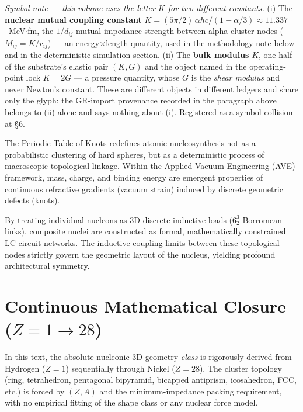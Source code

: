 \noindent\emph{Symbol note --- this volume uses the letter $K$ for two different constants.} (i) The \textbf{nuclear mutual coupling constant} $K = (5\pi/2)\,\alpha\hbar c/(1-\alpha/3) \approx 11.337$~MeV$\cdot$fm, the $1/d_{ij}$ mutual-impedance strength between alpha-cluster nodes ($M_{ij} = K/r_{ij}$) --- an energy$\times$length quantity, used in the methodology note below and in the deterministic-simulation section. (ii) The \textbf{bulk modulus} $K$, one half of the substrate's elastic pair $(K, G)$ and the object named in the operating-point lock $K = 2G$ --- a pressure quantity, whose $G$ is the \emph{shear modulus} and never Newton's constant. These are different objects in different ledgers and share only the glyph: the GR-import provenance recorded in the paragraph above belongs to (ii) alone and says nothing about (i). Registered as a symbol collision at  \S6.

The Periodic Table of Knots redefines atomic nucleosynthesis not as a probabilistic clustering of hard spheres, but as a deterministic process of macroscopic topological linkage. Within the Applied Vacuum Engineering (AVE) framework, mass, charge, and binding energy are emergent properties of continuous refractive gradients (vacuum strain) induced by discrete geometric defects (knots).

By treating individual nucleons as 3D discrete inductive loads ($6^3_2$ Borromean links), composite nuclei are constructed as formal, mathematically constrained LC circuit networks. The inductive coupling limits between these topological nodes strictly govern the geometric layout of the nucleus, yielding profound architectural symmetry. 

\section{Continuous Mathematical Closure ($Z=1 \rightarrow 28$)}
In this text, the absolute nucleonic 3D geometry \textit{class} is rigorously derived from Hydrogen ($Z=1$) sequentially through Nickel ($Z=28$). The cluster topology (ring, tetrahedron, pentagonal bipyramid, bicapped antiprism, icosahedron, FCC, etc.) is forced by $(Z, A)$ and the minimum-impedance packing requirement, with no empirical fitting of the shape class or any nuclear force model.

